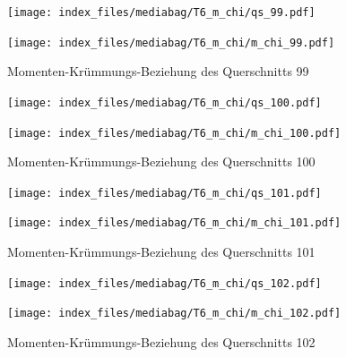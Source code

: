\documentclass[
  11pt,
  letterpaper,
]{scrreprt}
\begin{document}
\begin{figure}[H]

\begin{minipage}{0.50\linewidth}
\texttt{[image: index\_files/mediabag/T6\_m\_chi/qs\_99.pdf]}\end{minipage}%
%
\begin{minipage}{0.50\linewidth}
\texttt{[image: index\_files/mediabag/T6\_m\_chi/m\_chi\_99.pdf]}\end{minipage}%

\caption{\label{fig-m_chi_appendix}Momenten-Krümmungs-Beziehung des
Querschnitts 99}

\end{figure}%

\begin{figure}[H]

\begin{minipage}{0.50\linewidth}
\texttt{[image: index\_files/mediabag/T6\_m\_chi/qs\_100.pdf]}\end{minipage}%
%
\begin{minipage}{0.50\linewidth}
\texttt{[image: index\_files/mediabag/T6\_m\_chi/m\_chi\_100.pdf]}\end{minipage}%

\caption{\label{fig-m_chi_appendix}Momenten-Krümmungs-Beziehung des
Querschnitts 100}

\end{figure}%

\begin{figure}[H]

\begin{minipage}{0.50\linewidth}
\texttt{[image: index\_files/mediabag/T6\_m\_chi/qs\_101.pdf]}\end{minipage}%
%
\begin{minipage}{0.50\linewidth}
\texttt{[image: index\_files/mediabag/T6\_m\_chi/m\_chi\_101.pdf]}\end{minipage}%

\caption{\label{fig-m_chi_appendix}Momenten-Krümmungs-Beziehung des
Querschnitts 101}

\end{figure}%

\begin{figure}[H]

\begin{minipage}{0.50\linewidth}
\texttt{[image: index\_files/mediabag/T6\_m\_chi/qs\_102.pdf]}\end{minipage}%
%
\begin{minipage}{0.50\linewidth}
\texttt{[image: index\_files/mediabag/T6\_m\_chi/m\_chi\_102.pdf]}\end{minipage}%

\caption{\label{fig-m_chi_appendix}Momenten-Krümmungs-Beziehung des
Querschnitts 102}

\end{figure}%
\end{document}
